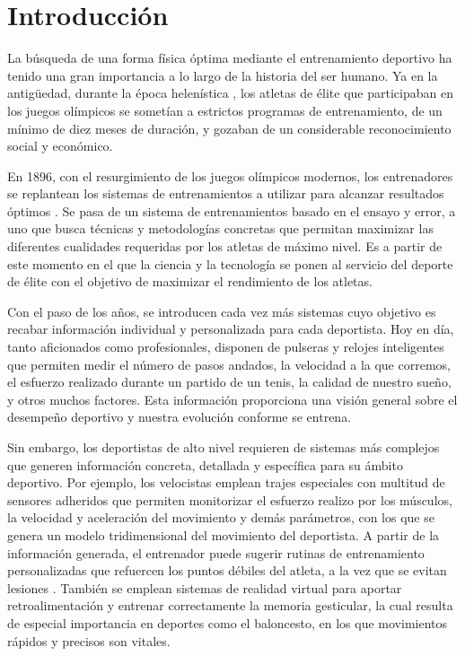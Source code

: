 \chapter{Introducción} \label{cap:capitulo1} 

La búsqueda de una forma física óptima mediante el entrenamiento deportivo ha tenido una gran importancia a lo largo de la historia del ser humano.
Ya en la antigüedad, durante la época helenística \cite{anta2013nuevas}, los atletas de élite que participaban en los juegos olímpicos se sometían a estrictos programas de entrenamiento, de un mínimo de diez meses de duración, y gozaban de un considerable reconocimiento social y económico. 

En 1896, con el resurgimiento de los juegos olímpicos modernos, los entrenadores se replantean los sistemas de entrenamientos a utilizar para alcanzar resultados óptimos \cite{anta2013nuevas}. Se pasa de un sistema de entrenamientos basado en el ensayo y error, a uno que busca técnicas y metodologías concretas que permitan maximizar las diferentes cualidades requeridas por los atletas de máximo nivel. Es a partir de este momento en el que la ciencia y la tecnología se ponen al servicio del deporte de élite con el objetivo de maximizar el rendimiento de los atletas.

Con el paso de los años, se introducen cada vez más sistemas cuyo objetivo es recabar información individual y personalizada para cada deportista. Hoy en día, tanto aficionados como profesionales, disponen de pulseras y relojes inteligentes que permiten medir el número de pasos andados, la velocidad a la que corremos, el esfuerzo realizado durante un partido de un tenis, la calidad de nuestro sueño, y otros muchos factores. Esta información proporciona una visión general sobre el desempeño deportivo y nuestra evolución conforme se entrena. 

Sin embargo, los deportistas de alto nivel requieren de sistemas más complejos que generen información concreta, detallada y específica para su ámbito deportivo. Por ejemplo, los velocistas emplean trajes especiales con multitud de sensores adheridos que permiten monitorizar el esfuerzo realizo por los músculos, la velocidad y aceleración del movimiento y demás parámetros, con los que se genera un modelo tridimensional del movimiento del deportista. A partir de la información generada, el entrenador puede sugerir rutinas de entrenamiento personalizadas que refuercen los puntos débiles del atleta, a la vez que se evitan lesiones \cite{rolecience}. También se emplean sistemas de realidad virtual \cite{sportvr} para aportar retroalimentación y entrenar correctamente la memoria gesticular, la cual resulta de especial importancia en deportes como el baloncesto, en los que movimientos rápidos y precisos son vitales.

